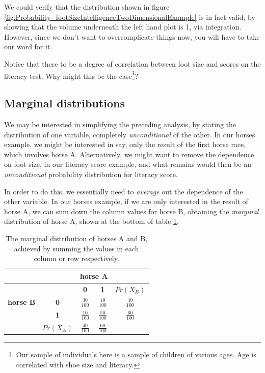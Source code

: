 \documentclass[11pt,fullpage]{book}
\begin{document}
We could verify that the distribution shown in figure \ref{fig:Probability_footSizeIntelligenceTwoDimensionalExample} is in fact valid, by showing that the volume underneath the left hand plot is 1, via integration. However, since we don't want to overcomplicate things now, you will have to take our word for it.

Notice that there to be a degree of correlation between foot size and scores on the literacy test. Why might this be the case\footnote{Our sample of individuals here is a sample of children of various ages. Age is correlated with shoe size and literacy.}?

\subsection{Marginal distributions}\label{sec:Probability_marginal}
We may be interested in simplifying the preceding analysis, by stating the distribution of one variable, completely \textit{unconditional} of the other. In our horses example, we might be interested in say, only the result of the first horse race, which involves horse A. Alternatively, we might want to remove the dependence on foot size, in our literacy score example, and what remains would then be an \textit{unconditional} probability distribution for literacy score.

In order to do this, we essentially need to \textit{average} out the dependence of the other variable. In our horses example, if we are only interested in the result of horse A, we can sum down the column values for horse B, obtaining the \textit{marginal} distribution of horse A, shown at the bottom of table \ref{tab:Probability_coinsMarginal}.


\begin{table}[htbp]
  \centering
    \begin{tabular}{rrccr}
    \toprule
          &       & \multicolumn{2}{c}{\textbf{horse A}} &  \\
    \midrule
          &       & \textbf{0} & \textbf{1} & \multicolumn{1}{c}{\textbf{$Pr(X_B)$}} \\
    \multicolumn{1}{c}{\textbf{horse B}} & \multicolumn{1}{c}{\textbf{0}} & $\frac{30}{100}$   & $\frac{10}{100}$    & \multicolumn{1}{c}{\textbf{$\frac{40}{100}$ }} \\
    \multicolumn{1}{c}{} & \multicolumn{1}{c}{\textbf{1}} & $\frac{10}{100}$    & $\frac{50}{100}$    & \multicolumn{1}{c}{\textbf{$\frac{60}{100}$ }} \\
          & \multicolumn{1}{c}{\textbf{$Pr(X_A)$}} & \textbf{$\frac{40}{100}$ } & \textbf{$\frac{60}{100}$ } & \multicolumn{1}{c}{} \\
    \bottomrule
    \end{tabular}%
  \caption{The marginal distribution of horses A and B, achieved by summing the values in each column or row respectively.}\label{tab:Probability_coinsMarginal}%
\end{table}%
\end{document}
